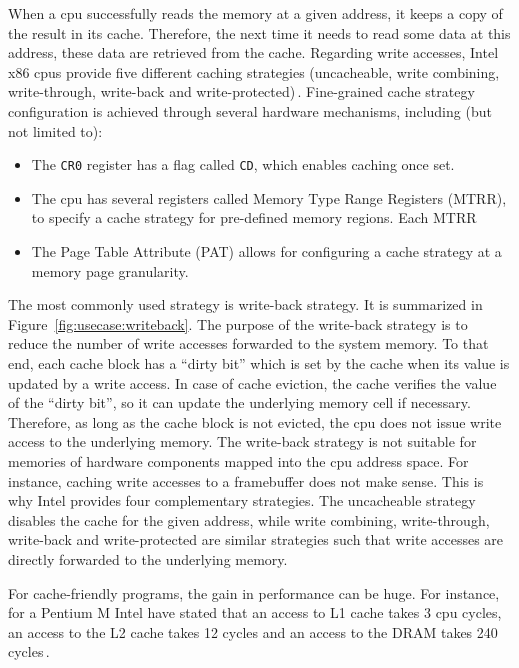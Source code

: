 When a \ac{cpu} successfully reads the memory at a given address, it keeps a
copy of the result in its cache.
%
Therefore, the next time it needs to read some data at this address, these data
are retrieved from the cache.
%
Regarding write accesses, Intel x86 \acp{cpu} provide five different caching
strategies (uncacheable, write combining, write-through, write-back and
write-protected)\,\cite[Volume 3, Chapter~11]{intel2014manual}.
%
Fine-grained cache strategy configuration is achieved through several hardware
mechanisms, including (but not limited to):
%
\begin{itemize}
\item The \texttt{CR0} register has a flag called \texttt{CD}, which enables
  caching once set.
%
\item The \ac{cpu} has several registers called Memory Type Range Registers
  (MTRR), to specify a cache strategy for pre-defined memory regions.
  Each MTRR
\item The Page Table Attribute (PAT) allows for configuring a cache strategy at
  a memory page granularity.
\end{itemize}
%
The most commonly used strategy is write-back strategy.
%
It is summarized in Figure~\ref{fig:usecase:writeback}.
%
The purpose of the write-back strategy is to reduce the number of write accesses
forwarded to the system memory.
%
To that end, each cache block has a ``dirty bit'' which is set by the cache when
its value is updated by a write access.
%
In case of cache eviction, the cache verifies the value of the ``dirty bit'', so
it can update the underlying memory cell if necessary.
%
Therefore, as long as the cache block is not evicted, the \ac{cpu} does not
issue write access to the underlying memory.
%
The write-back strategy is not suitable for memories of hardware components
mapped into the \ac{cpu} address space.
%
For instance, caching write accesses to a framebuffer does not make sense.
%
This is why Intel provides four complementary strategies.
%
The uncacheable strategy disables the cache for the given address, while write
combining, write-through, write-back and write-protected are similar strategies
such that write accesses are directly forwarded to the underlying memory.

For cache-friendly programs, the gain in performance can be huge.
%
For instance, for a Pentium M Intel have stated that an access to L1 cache takes
3 \ac{cpu} cycles, an access to the L2 cache takes 12 cycles and an access to
the DRAM takes 240 cycles\,\cite{drepper2007memory}.

